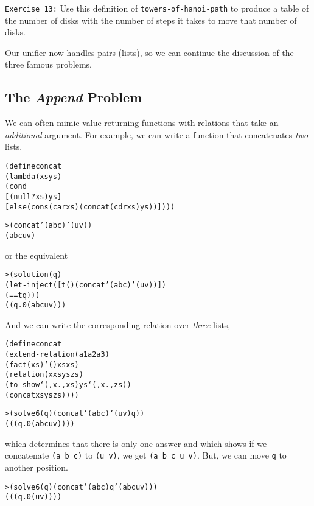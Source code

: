 \noindent
\texttt{Exercise 13:} Use this definition of
\texttt{towers-of-hanoi-path} to produce a table of the number of
disks with the number of steps it takes to move that number of disks.\endofexercise

Our unifier now handles pairs (lists), so we can continue the
discussion of the three famous problems.

\subsection{The \emph{Append} Problem}

We can often mimic value-returning functions with relations
that take an \emph{additional} argument.  For example,  we
can write a function that concatenates \emph{two} lists.

\begin{alltt}
(define concat
  (lambda (xs ys)
    (cond
      [(null? xs) ys]
      [else (cons (car xs) (concat (cdr xs) ys))])))
\end{alltt}

\begin{alltt}
> (concat '(a b c) '(u v))
(a b c u v)
\end{alltt}

\noindent
or the equivalent

\begin{alltt}
> (solution (q)
    (let-inject ([t () (concat '(a b c) '(u v))])
      (== t q)))
((q.0 (a b c u v)))
\end{alltt}

\noindent
And we can write the corresponding relation over \emph{three} lists,

\begin{alltt}
(define concat
  (extend-relation (a1 a2 a3)
    (fact (xs) '() xs xs)
    (relation (x xs ys zs)
      (to-show `(,x . ,xs) ys `(,x . ,zs))
      (concat xs ys zs))))
\end{alltt}
\noindent

\begin{alltt}
> (solve 6 (q) (concat '(a b c) '(u v) q))
(((q.0 (a b c u v))))
\end{alltt}

\noindent which determines that there is only one answer and which
shows if we concatenate \texttt{(a b c)} to \texttt{(u v)}, we get
\texttt{(a b c u v)}. But, we can move \texttt{q} to another position.

\begin{alltt}
> (solve 6 (q) (concat '(a b c) q '(a b c u v)))
(((q.0 (u v))))
\end{alltt}


